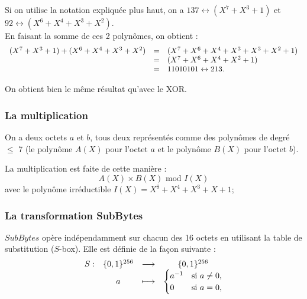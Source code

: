 Si on utilise la notation expliquée plus haut, on a 
$137 \leftrightarrow (X^7 + X^3 + 1)$ et
$92 \leftrightarrow (X^6 + X^4 + X^3 + X^2)$.\\

En faisant la somme de ces 2 polynômes, on obtient : 
$$
\begin{array}{c c l}
    (X^7 + X^3 + 1) + (X^6 + X^4 + X^3 + X^2) & = & (X^7 + X^6 + X^4 + X^3 + X^3 + X^2 + 1) \\
                                            & = & (X^7 + X^6 + X^4 + X^2 + 1) \\
                                            & = & 11010101 \leftrightarrow 213.
\end{array}
$$

On obtient bien le même résultat qu'avec le XOR.

\subsubsection{La multiplication}
On a deux octets $a$ et $b$, tous deux représentés comme des polynômes de degré $\leq$ 7 (le polynôme $A(X)$ pour l'octet $a$ et le polynôme $B(X)$ pour l'octet $b$).

La multiplication est faite de cette manière :
\begin{equation} A(X) \times B(X) \text{ mod } I(X) \end{equation}
avec le
polynôme irréductible $I(X) = X^8+X^4+X^3+X+1$; 



\subsubsection{La transformation SubBytes}

{$SubBytes$} opère indépendamment sur chacun des 16
octets en utilisant la table de substitution ($S$-box). Elle est définie de la façon suivante :
\begin{align*}
\begin{array}{c c c c}
    S : & \{0,1\}^{256} & \longrightarrow & \{0,1\}^{256} \\
    & a & \longmapsto &
  \begin{cases}
     a^{-1} & \text{si $a\neq 0$},\\
     0 & \text{si $a = 0$},\\
   \end{cases}
\end{array}
\end{align*}


